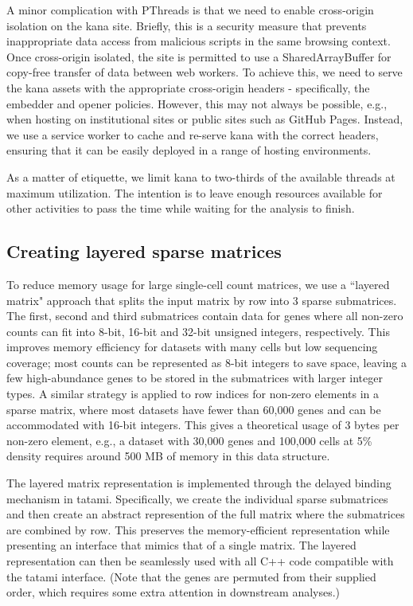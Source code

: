 \documentclass{article}
\begin{document}
A minor complication with PThreads is that we need to enable cross-origin isolation on the kana site.
Briefly, this is a security measure that prevents inappropriate data access from malicious scripts in the same browsing context.
Once cross-origin isolated, the site is permitted to use a SharedArrayBuffer for copy-free transfer of data between web workers.
To achieve this, we need to serve the kana assets with the appropriate cross-origin headers - specifically, the embedder and opener policies.
However, this may not always be possible, e.g., when hosting on institutional sites or public sites such as GitHub Pages.
Instead, we use a service worker to cache and re-serve kana with the correct headers,
ensuring that it can be easily deployed in a range of hosting environments.

As a matter of etiquette, we limit kana to two-thirds of the available threads at maximum utilization.
The intention is to leave enough resources available for other activities to pass the time while waiting for the analysis to finish.

\subsection{Creating layered sparse matrices}

To reduce memory usage for large single-cell count matrices, we use a ``layered matrix" approach that splits the input matrix by row into 3 sparse submatrices.
The first, second and third submatrices contain data for genes where all non-zero counts can fit into 8-bit, 16-bit and 32-bit unsigned integers, respectively.
This improves memory efficiency for datasets with many cells but low sequencing coverage;
most counts can be represented as 8-bit integers to save space, leaving a few high-abundance genes to be stored in the submatrices with larger integer types.
A similar strategy is applied to row indices for non-zero elements in a sparse matrix, where most datasets have fewer than 60,000 genes and can be accommodated with 16-bit integers.
This gives a theoretical usage of 3 bytes per non-zero element, e.g., a dataset with 30,000 genes and 100,000 cells at 5\% density requires around 500 MB of memory in this data structure.

The layered matrix representation is implemented through the delayed binding mechanism in tatami.
Specifically, we create the individual sparse submatrices and then create an abstract represention of the full matrix where the submatrices are combined by row.
This preserves the memory-efficient representation while presenting an interface that mimics that of a single matrix.
The layered representation can then be seamlessly used with all C++ code compatible with the tatami interface.
(Note that the genes are permuted from their supplied order, which requires some extra attention in downstream analyses.)
\end{document}
